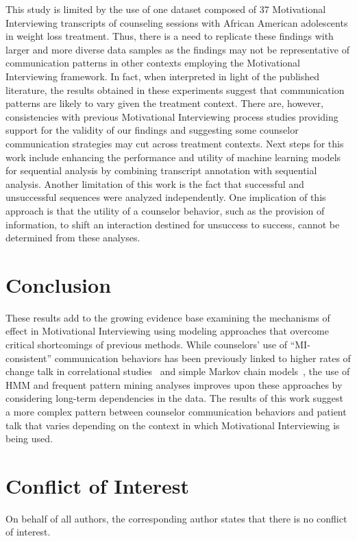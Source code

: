 This study is limited by the use of one dataset composed of 37 Motivational Interviewing transcripts of counseling sessions with African American adolescents in weight loss treatment. Thus, there is a need to replicate these findings with larger and more diverse data samples as the findings may not be representative of communication patterns in other contexts employing the Motivational Interviewing framework. In fact, when interpreted in light of the published literature, the results obtained in these experiments suggest that communication patterns are likely to vary given the treatment context. There are, however, consistencies with previous Motivational Interviewing process studies providing support for the validity of our findings and suggesting some counselor communication strategies may cut across treatment contexts. Next steps for this work include enhancing the performance and utility of machine learning models for sequential analysis by combining transcript annotation with sequential analysis. Another limitation of this work is the fact that successful and unsuccessful sequences were analyzed independently. One implication of this approach is that the utility of a counselor behavior, such as the provision of information, to shift an interaction destined for unsuccess to success, cannot be determined from these analyses.

\section{Conclusion}
\label{sec:conclusion}
These results add to the growing evidence base examining the mechanisms of effect in Motivational Interviewing using modeling approaches that overcome critical shortcomings of previous methods. While counselors' use of ``MI-consistent'' communication behaviors has been previously linked to higher rates of change talk in correlational studies~\cite{moyers2006therapist, catley2006adherence, thrasher2006motivational, mccambridge2011fidelity} and simple Markov chain models~\cite{moyers2006therapist, moyers2009session, gaume2010counselor}, the use of HMM and frequent pattern mining analyses improves upon these approaches by considering long-term dependencies in the data. The results of this work suggest a more complex pattern between counselor communication behaviors and patient talk that varies depending on the context in which Motivational Interviewing is being used.  

\section{Conflict of Interest}
\label{sec:conflictofInterest}
On behalf of all authors, the corresponding author states that there is no conflict of interest.

